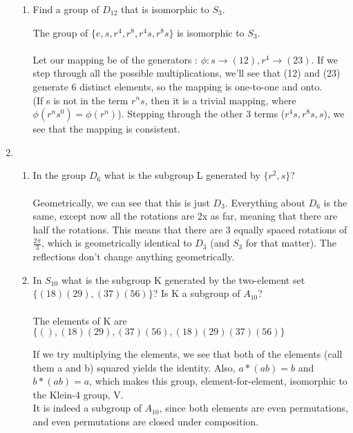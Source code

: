 \begin{enumerate}
\begin{enumerate}
  \item Find a group of $D_{12}$ that is isomorphic to $S_3$.

  The group of $\{e, s, r^4, r^8, r^4s, r^8s\}$ is isomorphic to $S_3$.\\\\

  Let our mapping be of the generators : $\phi : s \rightarrow (12), r^4 \rightarrow (23)$. If we step through all the possible multiplications, we'll see that (12) and (23) generate 6 distinct elements, so the mapping is one-to-one and onto.\\
  (If s is not in the term $r^ns$, then it is a trivial mapping, where $\phi(r^ns^0) = \phi(r^n)$). Stepping through the other 3 terms ($r^4s, r^8s, s$), we see that the mapping is consistent.
  \end{enumerate}

  \item
        \begin{enumerate}
          \item In the group $D_6$ what is the subgroup L generated by $\{r^2, s\}$?\\\\

          Geometrically, we can see that this is just $D_3$. Everything about $D_6$ is the same, except now all the rotations are 2x as far, meaning that there are half the rotations. This means that there are 3 equally spaced rotations of $\frac{2\pi}{3}$, which is geometrically identical to $D_3$ (and $S_3$ for that matter). The reflections don't change anything geometrically.

          \item In $S_{10}$ what is the subgroup K generated by the two-element set $\{(18)(29), (37)(56)\}$? Is K a subgroup of $A_{10}$?\\\\

          The elements of K are $\{(), (18)(29), (37)(56), (18)(29)(37)(56)\}$

          If we try multiplying the elements, we see that both of the elements (call them a and b) squared yields the identity. Also, $a * (ab) = b$ and $b * (ab) = a$, which makes this group, element-for-element, isomorphic to the Klein-4 group, V.\\

          It is indeed a subgroup of $A_{10}$, since both elements are even permutations, and even permutations are closed under composition.
        \end{enumerate}
\end{enumerate}       

